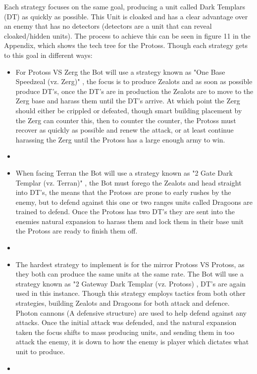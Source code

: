 \documentclass[journal]{IEEEtran}
\begin{document}
Each strategy focuses on the same goal, producing a unit called Dark Templars (DT) as quickly as possible. This Unit is cloaked and has a clear advantage over an enemy that has no detectors (detectors are a unit that can reveal cloaked/hidden units). The process to achieve this can be seen in figure 11 in the Appendix, which shows the tech tree for the Protoss.
Though each strategy gets to this goal in different ways:

\begin{itemize}
	\item For Protoss VS Zerg the Bot will use a strategy known as "One Base Speedzeal (vz. Zerg)" \cite{PVZ}, the focus is to produce Zealots and as soon as possible produce DT's, once the DT's are in production the Zealots are to move to the Zerg base and harass them until the DT's arrive. At which point the Zerg should either be crippled or defeated, though smart building placement by the Zerg can counter this, then to counter the counter, the Protoss must recover as quickly as possible and renew the attack, or at least continue harassing the Zerg until the Protoss has a large enough army to win.
	\item[]
	\item When facing Terran the Bot will use a strategy known as "2 Gate Dark Templar (vz. Terran)" \cite{PVT}, the Bot must forego the Zealots and head straight into DT's, the means that the Protoss are prone to early rushes by the enemy, but to defend against this one or two ranges units called Dragoons are trained to defend. Once the Protoss has two DT's they are sent into the enemies natural expansion to harass them and lock them in their base unit the Protoss are ready to finish them off.
	\item[]
	\item The hardest strategy to implement is for the mirror Protoss VS Protoss, as they both can produce the same units at the same rate. The Bot will use a strategy known as "2 Gateway Dark Templar (vz. Protoss) \cite{PVP}, DT's are again used in this instance. Though this strategy employs tactics from both other strategies, building Zealots and Dragoons for both attack and defence. Photon cannons (A defensive structure) are used to help defend against any attacks. Once the initial attack was defended, and the natural expansion taken the focus shifts to mass producing units, and sending them in too attack the enemy, it is down to how the enemy is player which dictates what unit to produce.
	\item[]
\end{itemize}
\end{document}
